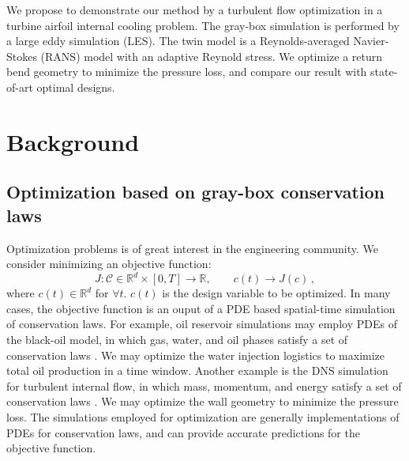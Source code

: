 \documentclass[a4paper,onecolumn]{article}
\theoremstyle{remark}
\begin{document}
\noindent We propose to demonstrate our method by a turbulent flow optimization in a turbine airfoil
internal cooling problem. The gray-box
simulation is performed by a large eddy simulation (LES). 
The twin model is a Reynolds-averaged Navier-Stokes (RANS)
model with an adaptive Reynold stress. We optimize a return bend
geometry to minimize the pressure loss, and compare our result with state-of-art 
optimal designs.


\newpage
\tableofcontents


\newpage
\section{Background}
\label{intro}

\subsection{Optimization based on gray-box conservation laws}
Optimization problems is of great interest in the engineering community. We consider minimizing an
objective function:
$$
    J: \mathcal{C} \in \mathbb{R}^d\times [0,T] \rightarrow \mathbb{R}, \qquad c(t) \rightarrow J(c)\,,
$$
where $c(t) \in \mathbb{R}^d$ for $\forall t$. $c(t)$ is the design variable to be optimized.
In many cases, the objective function is an ouput of
a PDE based spatial-time simulation of conservation laws. 
For example, oil reservoir simulations may employ PDEs of the black-oil model, 
in which gas, water, and oil phases satisfy a set of conservation laws 
\cite{reservoir simulation book}. 
We may optimize the water injection logistics to maximize total oil production in a time window.
Another example is the DNS simulation for turbulent internal flow, in which mass, momentum, and energy
satisfy a set of conservation laws
\cite{Wilcox CFD}.
We may optimize the wall geometry to minimize the pressure loss.
The simulations employed for optimization are generally
implementations of PDEs for conservation laws, and can provide accurate predictions for 
the objective function.\\
\end{document}
